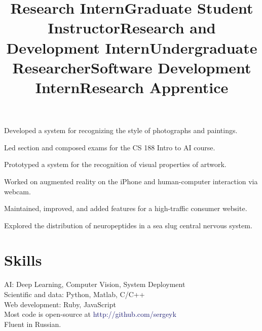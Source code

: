 \documentclass[line, margin]{res}
\begin{document}
\begin{resume}
\title{\bf Research Intern}
\begin{position}
Developed a system for recognizing the style of photographs and paintings.
\end{position}

\title{\bf Graduate Student Instructor}
\begin{position}
Led section and composed exams for the CS 188 Intro to AI course.
\end{position}

\title{\bf Research and Development Intern}
\begin{position}
Prototyped a system for the recognition of visual properties of artwork.
\end{position}

\title{\bf Undergraduate Researcher}
\begin{position}
Worked on augmented reality on the iPhone and human-computer interaction via webcam.
\end{position}

\title{\bf Software Development Intern}
\begin{position}
Maintained, improved, and added features for a high-traffic consumer website.
\end{position}


\title{\bf Research Apprentice}
\begin{position}
Explored the distribution of neuropeptides in a sea slug central nervous system.
\end{position}

\section{\sc Skills}
AI: Deep Learning, Computer Vision, System Deployment\\
Scientific and data: Python, Matlab, C/C++\\
Web development: Ruby, JavaScript\\
Most code is open-source at \textcolor{MidnightBlue}{http://github.com/sergeyk}\\
Fluent in Russian.


\end{resume}
\end{document}
